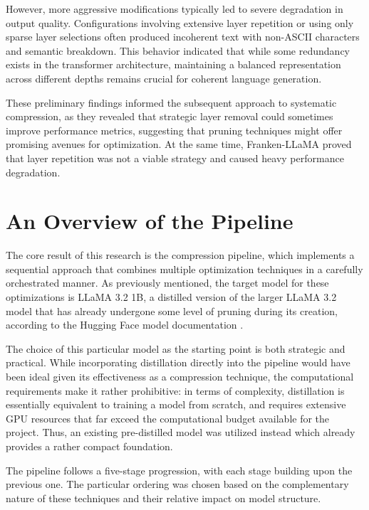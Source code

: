 However, more aggressive modifications typically led to severe degradation in output quality. Configurations involving extensive layer repetition or using only sparse layer selections often produced incoherent text with non-ASCII characters and semantic breakdown. This behavior indicated that while some redundancy exists in the transformer architecture, maintaining a balanced representation across different depths remains crucial for coherent language generation.

These preliminary findings informed the subsequent approach to systematic compression, as they revealed that strategic layer removal could sometimes improve performance metrics, suggesting that pruning techniques might offer promising avenues for optimization. At the same time, Franken-LLaMA proved that layer repetition was not a viable strategy and caused heavy performance degradation.

\section{An Overview of the Pipeline}

The core result of this research is the compression pipeline, which implements a sequential approach that combines multiple optimization techniques in a carefully orchestrated manner. As previously mentioned, the target model for these optimizations is LLaMA 3.2 1B, a distilled version of the larger LLaMA 3.2 model that has already undergone some level of pruning during its creation, according to the Hugging Face model documentation \cite{llama3_1b}.

The choice of this particular model as the starting point is both strategic and practical. While incorporating distillation directly into the pipeline would have been ideal given its effectiveness as a compression technique, the computational requirements make it rather prohibitive: in terms of complexity, distillation is essentially equivalent to training a model from scratch, and requires extensive GPU resources that far exceed the computational budget available for the project. Thus, an existing pre-distilled model was utilized instead which already provides a rather compact foundation.

The pipeline follows a five-stage progression, with each stage building upon the previous one. The particular ordering was chosen based on the complementary nature of these techniques and their relative impact on model structure.


